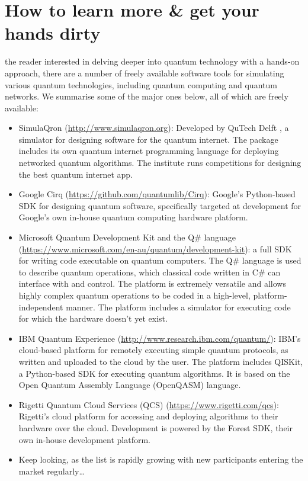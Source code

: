 %
%

\section{How to learn more \& get your hands dirty}

 the reader interested in delving deeper into quantum technology with a hands-on approach, there are a number of freely available software tools for simulating various quantum technologies, including quantum computing and quantum networks. We summarise some of the major ones below, all of which are freely available:

\begin{itemize}
	\item SimulaQron (\href{http://www.simulaqron.org}{http://www.simulaqron.org}): Developed by QuTech Delft \cite{bib:AxelDahlbergQron}, a simulator for designing software for the quantum internet. The package includes its own quantum internet programming language for deploying networked quantum algorithms. The institute runs competitions for designing the best quantum internet app.
	\item Google Cirq (\href{https://github.com/quantumlib/Cirq}{https://github.com/quantumlib/Cirq}): Google's Python-based SDK for designing quantum software, specifically targeted at development for Google's own in-house quantum computing hardware platform.
	\item Microsoft Quantum Development Kit and the Q\# language (\href{https://www.microsoft.com/en-au/quantum/development-kit}{https://www.microsoft.com/en-au/quantum/development-kit}): a full SDK for writing code executable on quantum computers. The Q\# language is used to describe quantum operations, which classical code written in C\# can interface with and control. The platform is extremely versatile and allows highly complex quantum operations to be coded in a high-level, platform-independent manner. The platform includes a simulator for executing code for which the hardware doesn't yet exist.
	\item IBM Quantum Experience (\href{http://www.research.ibm.com/quantum/}{http://www.research.ibm.com/quantum/}): IBM's cloud-based platform for remotely executing simple quantum protocols, as written and uploaded to the cloud by the user. The platform includes QISKit, a Python-based SDK for executing quantum algorithms. It is based on the Open Quantum Assembly Language (OpenQASM) language.
	\item Rigetti Quantum Cloud Services (QCS) (\href{https://www.rigetti.com/qcs}{https://www.rigetti.com/qcs}): Rigetti's cloud platform for accessing and deploying algorithms to their hardware over the cloud. Development is powered by the Forest SDK, their own in-house development platform.
	\item Keep looking, as the list is rapidly growing with new participants entering the market regularly\ldots
\end{itemize}
